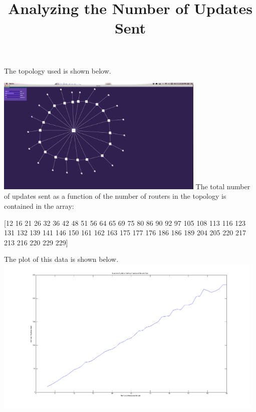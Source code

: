 \documentclass[]{article}
\begin{document}
\title{Analyzing the Number of Updates Sent}
\maketitle
\newpage
The topology used is shown below. \\
\linebreak

\begin{center}
\includegraphics[width=10cm]{topology.png}
\linebreak
The total number of updates sent as a function of the number of routers in the topology is contained in the array: 

[12
16
21
26
32
36
42
48
51
56
64
65
69
75
80
86
90
92
97
105
108
113
116
123
131
132
139
141
146
150
161
162
163
175
177
176
186
186
189
204
205
220
217
213
216
220
229
229]
\linebreak

The plot of this data is shown below.
\includegraphics[width=13cm]{plot.png}
\end{center}
\end{document}
